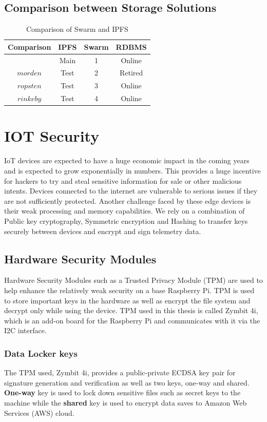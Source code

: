 \documentclass[11pt,openright]{report}
\begin{document}
\subsection{Comparison between Storage Solutions}
\begin{table}[!htbp]
	\renewcommand{\arraystretch}{1.3}
	\caption{Comparison of Swarm and IPFS}
	\label{pub_eth_networks}
	\centering
	\begin{tabular}{|c||c|c|c|}
		\hline
		\bfseries Comparison & \bfseries IPFS & \bfseries Swarm & \bfseries RDBMS \\
		\hline\hline
		 & Main & 1 & Online \\ \hline
		$morden$ & Test & 2 & Retired \\ \hline
		$ropsten$ & Test & 3 & Online \\ \hline
		$rinkeby$ & Test & 4 & Online \\ \hline

	\end{tabular}
\end{table}

\section{IOT Security}
IoT devices are expected to have a huge economic impact in the coming years and is expected to grow exponentially in numbers. This provides a huge incentive for hackers to try and steal sensitive information for sale or other malicious intents. Devices connected to the internet are vulnerable to serious issues if they are not sufficiently protected. Another challenge faced by these edge devices is their weak processing and memory capabilities. We rely on a combination of Public key cryptography, Symmetric encryption and Hashing to transfer keys securely between devices and encrypt and sign telemetry data. 

\subsection{Hardware Security Modules}
Hardware Security Modules such as a Trusted Privacy Module (TPM) are used to help enhance the relatively weak security on a base Raspberry Pi. TPM is used to store important keys in the hardware as well as encrypt the file system and decrypt only while using the device. TPM used in this thesis is called Zymbit 4i, which is an add-on board for the Raspberry Pi and communicates with it via the I2C interface.

\subsubsection{Data Locker keys}
The TPM used, Zymbit 4i, provides a public-private ECDSA key pair for signature generation and verification as well as two keys, one-way and shared. \textbf{One-way} key is used to lock down sensitive files such as secret keys to the machine while the \textbf{shared} key is used to encrypt data saves to Amazon Web Services (AWS) cloud. 
\end{document}
